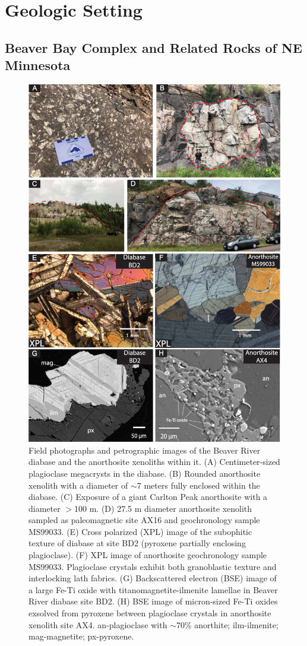 \documentclass[draft]{agujournal2019}
\begin{document}
\section{Geologic Setting}

\subsection{Beaver Bay Complex and Related Rocks of NE Minnesota}

\begin{figure}
\centering
\noindent\includegraphics[width=4.75 in]{Field_photo.pdf}
\caption{\footnotesize{Field photographs and petrographic images of the Beaver River diabase and the anorthosite xenoliths within it. (A) Centimeter-sized plagioclase megacrysts in the diabase. (B) Rounded anorthosite xenolith with a diameter of $\sim$7 meters fully enclosed within the diabase. (C) Exposure of a giant Carlton Peak anorthosite with a diameter $>$100 m. (D) 27.5 m diameter anorthosite xenolith sampled as paleomagnetic site AX16 and geochronology sample MS99033. (E) Cross polarized (XPL) image of the subophitic texture of diabase at site BD2 (pyroxene partially enclosing plagioclase). (F) XPL image of anorthosite geochronology sample MS99033. Plagioclase crystals exhibit both granoblastic texture and interlocking lath fabrics. (G) Backscattered electron (BSE) image of a large Fe-Ti oxide with titanomagnetite-ilmenite lamellae in Beaver River diabase site BD2. (H) BSE image of micron-sized Fe-Ti oxides exsolved from pyroxene between plagioclase crystals in anorthosite xenolith site AX4. an-plagioclase with $\sim$70\% anorthite; ilm-ilmenite; mag-magnetite; px-pyroxene.}}
\label{fig:Field_photo}
\end{figure}
\end{document}

